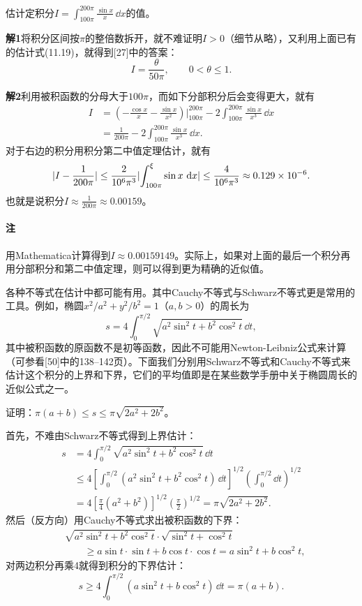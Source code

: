 \begin{xexample}[11.3.2]
估计定积分$I=\int_{100\pi}^{200\pi}\frac{\sin x}{x}\,\dd x$的值。
\end{xexample}
\begin{xsolution}
\textbf{解1}\quad 将积分区间按$\pi$的整倍数拆开，就不难证明$I>0$（细节从略），又利用上面已有的估计式(11.19)，就得到[27]中的答案：
\[
  I=\frac{\theta}{50\pi},\qquad 0<\theta\le1.
\]

\textbf{解2}\quad 利用被积函数的分母大于$100\pi$，而如下分部积分后会变得更大，就有
\begin{align*}
I&=\left(-\frac{\cos x}{x}-\frac{\sin x}{x^2}\right)\Big|_{100\pi}^{200\pi}
 -2\int_{100\pi}^{200\pi}\frac{\sin x}{x^3}\,\dd x\\
&=\frac1{200\pi}-2\int_{100\pi}^{200\pi}\frac{\sin x}{x^3}\,\dd x.
\end{align*}
对于右边的积分用积分第二中值定理估计，就有
\[
  \lvert I-\frac1{200\pi}\rvert
  \le\frac2{10^6\pi^3}\lvert\int_{100\pi}^{\xi}\sin x\,\mathop{}\!\mathrm{d} x\rvert
  \le\frac4{10^6\pi^3}\approx0.129\times10^{-6}.
\]
也就是说积分$I\approx\frac1{200\pi}\approx0.00159$。

\paragraph{注} 用Mathematica计算得到$I\approx0.00159149$。实际上，如果对上面的最后一个积分再用分部积分和第二中值定理，则可以得到更为精确的近似值。
\end{xsolution}

各种不等式在估计中都可能有用。其中Cauchy不等式与Schwarz不等式更是常用的工具。例如，椭圆$x^2/a^2+y^2/b^2=1$（$a,b>0$）的周长为
\[
  s=4\int_0^{\pi/2}\sqrt{a^2\sin^2t+b^2\cos^2t}\,\dd t,
\]
其中被积函数的原函数不是初等函数，因此不可能用Newton-Leibniz公式来计算（可参看[50]中的138--142页）。下面我们分别用Schwarz不等式和Cauchy不等式来估计这个积分的上界和下界，它们的平均值即是在某些数学手册中关于椭圆周长的近似公式之一。

\begin{xexample}[11.3.3]
证明：$\pi(a+b)\le s\le\pi\sqrt{2a^2+2b^2}$。
\end{xexample}
\begin{xproof}
首先，不难由Schwarz不等式得到上界估计：
\begin{align*}
s&=4\int_0^{\pi/2}\sqrt{a^2\sin^2t+b^2\cos^2t}\,\dd t\\
&\le4\left[\int_0^{\pi/2}(a^2\sin^2t+b^2\cos^2t)\,\dd t\right]^{1/2}
\left(\int_0^{\pi/2}\dd t\right)^{1/2}\\
&=4\left[\frac\pi4(a^2+b^2)\right]^{1/2}\left(\frac\pi2\right)^{1/2}
=\pi\sqrt{2a^2+2b^2}.
\end{align*}
然后（反方向）用Cauchy不等式求出被积函数的下界：
\begin{align*}
&\sqrt{a^2\sin^2t+b^2\cos^2t}\cdot\sqrt{\sin^2t+\cos^2t}\\
&\qquad\ge a\sin t\cdot\sin t+b\cos t\cdot\cos t
=a\sin^2t+b\cos^2t,
\end{align*}
对两边积分再乘4就得到积分的下界估计：
\[
  s\ge4\int_0^{\pi/2}(a\sin^2t+b\cos^2t)\,\dd t=\pi(a+b).
\]
\end{xproof}

